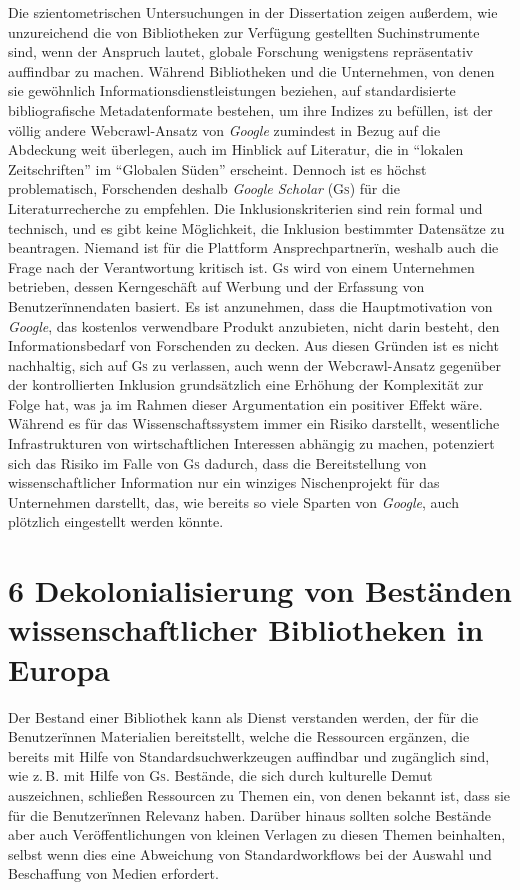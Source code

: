 \documentclass[a4paper,
fontsize=11pt,
oneside,
numbers=noperiodatend,
parskip=half-,
bibliography=totoc,
final
]{scrartcl}
\begin{document}
Die szientometrischen Untersuchungen in der Dissertation zeigen
außerdem, wie unzureichend die von Bibliotheken zur Verfügung gestellten
Suchinstrumente sind, wenn der Anspruch lautet, globale Forschung
wenigstens repräsentativ auffindbar zu machen. Während Bibliotheken und
die Unternehmen, von denen sie gewöhnlich Informationsdienstleistungen
beziehen, auf standardisierte bibliografische Metadatenformate bestehen,
um ihre Indizes zu befüllen, ist der völlig andere Webcrawl-Ansatz von
\emph{Google} zumindest in Bezug auf die Abdeckung weit überlegen, auch
im Hinblick auf Literatur, die in \enquote{lokalen Zeitschriften} im
\enquote{Globalen Süden} erscheint. Dennoch ist es höchst problematisch,
Forschenden deshalb \emph{Google Scholar} (\textsc{Gs}) für die
Literaturrecherche zu empfehlen. Die Inklusionskriterien sind rein
formal und technisch, und es gibt keine Möglichkeit, die Inklusion
bestimmter Datensätze zu beantragen. Niemand ist für die Plattform
Ansprechpartnerïn, weshalb auch die Frage nach der Verantwortung
kritisch ist. \textsc{Gs} wird von einem Unternehmen betrieben, dessen
Kerngeschäft auf Werbung und der Erfassung von Benutzerïnnendaten
basiert. Es ist anzunehmen, dass die Hauptmotivation von \emph{Google},
das kostenlos verwendbare Produkt anzubieten, nicht darin besteht, den
Informationsbedarf von Forschenden zu decken. Aus diesen Gründen ist es
nicht nachhaltig, sich auf \textsc{Gs} zu verlassen, auch wenn der
Webcrawl-Ansatz gegenüber der kontrollierten Inklusion grundsätzlich
eine Erhöhung der Komplexität zur Folge hat, was ja im Rahmen dieser
Argumentation ein positiver Effekt wäre. Während es für das
Wissenschaftssystem immer ein Risiko darstellt, wesentliche
Infrastrukturen von wirtschaftlichen Interessen abhängig zu machen,
potenziert sich das Risiko im Falle von \textsc{Gs} dadurch, dass die
Bereitstellung von wissenschaftlicher Information nur ein winziges
Nischenprojekt für das Unternehmen darstellt, das, wie bereits so viele
Sparten von \emph{Google}, auch plötzlich eingestellt werden könnte.

\hypertarget{biblio}{%
\section{6 Dekolonialisierung von Beständen wissenschaftlicher
Bibliotheken in Europa}\label{biblio}}

Der Bestand einer Bibliothek kann als Dienst verstanden werden, der für
die Benutzerïnnen Materialien bereitstellt, welche die Ressourcen
ergänzen, die bereits mit Hilfe von Standardsuchwerkzeugen auffindbar
und zugänglich sind, wie z. B. mit Hilfe von \textsc{Gs}. Bestände, die
sich durch kulturelle Demut auszeichnen, schließen Ressourcen zu Themen
ein, von denen bekannt ist, dass sie für die Benutzerïnnen Relevanz
haben. Darüber hinaus sollten solche Bestände aber auch
Veröffentlichungen von kleinen Verlagen zu diesen Themen beinhalten,
selbst wenn dies eine Abweichung von Standardworkflows bei der Auswahl
und Beschaffung von Medien erfordert.
\end{document}

